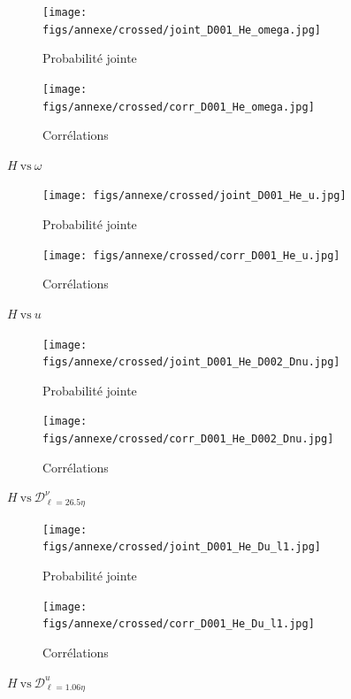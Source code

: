 \documentclass[13pt, a4paper]{extarticle}
\begin{document}
\begin{figure}[H]
  \centering
  \begin{subfigure}[b]{0.48\linewidth}
  \centering
  \texttt{[image: figs/annexe/crossed/joint\_D001\_He\_omega.jpg]}
  \caption{Probabilité jointe}
  \end{subfigure}
  \begin{subfigure}[b]{0.48\linewidth}
    \centering
    \texttt{[image: figs/annexe/crossed/corr\_D001\_He\_omega.jpg]}
    \caption{Corrélations}
    \end{subfigure}
    \caption{$H~\text{vs}~\omega$}
\end{figure}

\begin{figure}[H]
  \centering
  \begin{subfigure}[b]{0.48\linewidth}
  \centering
  \texttt{[image: figs/annexe/crossed/joint\_D001\_He\_u.jpg]}
  \caption{Probabilité jointe}
  \end{subfigure}
  \begin{subfigure}[b]{0.48\linewidth}
    \centering
    \texttt{[image: figs/annexe/crossed/corr\_D001\_He\_u.jpg]}
    \caption{Corrélations}
    \end{subfigure}
    \caption{$H~\text{vs}~u$}
\end{figure}

\begin{figure}[H]
  \centering
  \begin{subfigure}[b]{0.48\linewidth}
  \centering
  \texttt{[image: figs/annexe/crossed/joint\_D001\_He\_D002\_Dnu.jpg]}
  \caption{Probabilité jointe}
  \end{subfigure}
  \begin{subfigure}[b]{0.48\linewidth}
    \centering
    \texttt{[image: figs/annexe/crossed/corr\_D001\_He\_D002\_Dnu.jpg]}
    \caption{Corrélations}
    \end{subfigure}
    \caption{$H~\text{vs}~\mathscr{D}^\nu_{\ell=26.5\eta}$}
\end{figure}

\begin{figure}[H]
  \centering
  \begin{subfigure}[b]{0.48\linewidth}
  \centering
  \texttt{[image: figs/annexe/crossed/joint\_D001\_He\_Du\_l1.jpg]}
  \caption{Probabilité jointe}
  \end{subfigure}
  \begin{subfigure}[b]{0.48\linewidth}
    \centering
    \texttt{[image: figs/annexe/crossed/corr\_D001\_He\_Du\_l1.jpg]}
    \caption{Corrélations}
    \end{subfigure}
    \caption{$H~\text{vs}~\mathscr{D}^u_{\ell=1.06\eta}$}
\end{figure}
\end{document}
